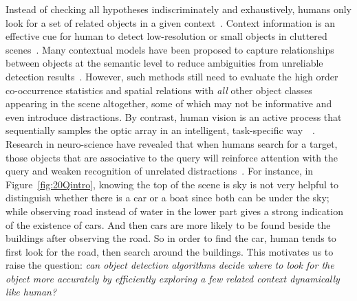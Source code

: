 Instead of checking all hypotheses indiscriminately and exhaustively, humans only look for a set of related objects in a given context~\cite{biederman1982scene, hock1974contextual}. Context information is an effective cue for human to detect low-resolution or small objects in cluttered scenes~\cite{parikh2012exploring}. Many contextual models have been proposed to capture relationships between objects at the semantic level to reduce ambiguities from unreliable detection results~\cite{gould2009decomposing, galleguillos2010context, ladicky2010graph}. %
However, such methods still need to evaluate the high order co-occurrence statistics and spatial relations with \emph{all} other object classes appearing in the scene altogether, some of which may not be informative and even introduce distractions.  By contrast, human vision is an active process that sequentially samples the optic array in an intelligent, task-specific way~\cite{najemnik2005optimal}~. Research in neuro-science have revealed that when humans search for a target, those objects that are associative to the query will reinforce attention with the query and weaken recognition of unrelated distractions~\cite{moores2003associative}. 
For instance, in Figure~\ref{fig:20Qintro}, knowing the top of the scene is sky is not very helpful to distinguish whether there is a car or a boat since both can be under the sky; 
while observing road instead of water in the lower part gives a strong indication of the existence of cars. And then cars are more likely to be found beside the buildings after observing the road. So in order to find the car, human tends to first look for the road, then search around the buildings. %
This motivates us to raise the question: \textit{can object detection algorithms decide where to look for the object more accurately by efficiently exploring a few related context dynamically like human?}

